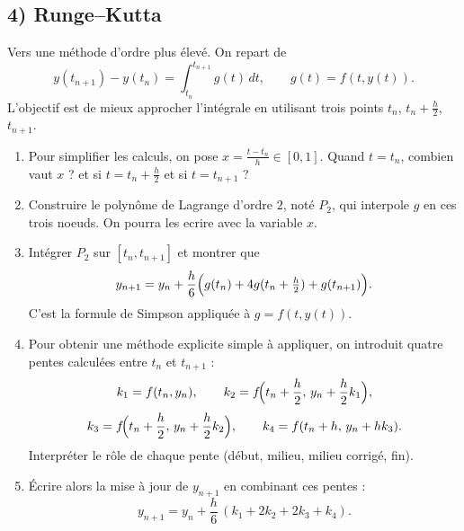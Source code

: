 \begin{enumerate}[itemsep=0.5em]

\end{enumerate}

\subsection*{4) Runge--Kutta}
Vers une méthode d'ordre plus élevé.
On repart de
\[
  y(t_{n+1})-y(t_n)=\int_{t_n}^{t_{n+1}} g(t)\,dt,
  \qquad g(t)=f(t,y(t)).
\]
L'objectif est de mieux approcher l'intégrale en utilisant trois points
$t_n$, $t_n+\frac h2$, $t_{n+1}$.
\begin{enumerate}[label=\alph*)]
  \item Pour simplifier les calculs, on pose $x = \frac{t-t_n}{h} \in [0,1]$. \newline 
  Quand $t=t_n$, combien vaut $x$ ? et si  $t = t_n+\frac h2$ et si $t= t_{n+1}$ ?

  \item Construire le polynôme de Lagrange d'ordre $2$, noté $P_2$, qui interpole
  $g$ en ces trois noeuds. On pourra les ecrire avec la variable $x$.

  \item Intégrer $P_2$ sur $[t_n,t_{n+1}]$ et montrer que
  \[
    y_{n+1}=y_n+\frac h6\Bigl(g(t_n)+4g(t_n+\tfrac h2)+g(t_{n+1})\Bigr).
  \]
  C'est la formule de Simpson appliquée à $g=f(t,y(t))$.
  \item Pour obtenir une méthode explicite simple à appliquer, on introduit
  quatre pentes calculées entre $t_n$ et $t_{n+1}$ :
  \[
    k_1=f(t_n,y_n),\qquad
    k_2=f\!\Bigl(t_n+\frac h2,\,y_n+\frac h2k_1\Bigr),
  \]
  \[
    k_3=f\!\Bigl(t_n+\frac h2,\,y_n+\frac h2k_2\Bigr),\qquad
    k_4=f(t_n+h,\,y_n+hk_3).
  \]
  Interpréter le rôle de chaque pente (début, milieu, milieu corrigé, fin).
  \item Écrire alors la mise à jour de $y_{n+1}$ en combinant ces pentes :
  \[
    y_{n+1}=y_n+\frac h6\,(k_1+2k_2+2k_3+k_4).
  \]
\end{enumerate}

